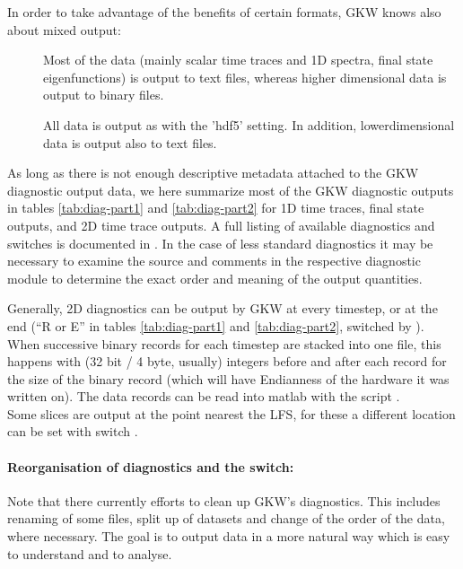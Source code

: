 In order to take advantage of the benefits of certain formats, GKW
knows also about mixed output:
\begin{description}
\item[] Most of the data (mainly scalar time
  traces and 1D spectra,  final state
  eigenfunctions) is output to text files, whereas higher dimensional
  data is output to binary files.
\item[] All data is output as with the
  'hdf5' setting. In addition, lowerdimensional data is output also to
  text files.
\end{description}

As long as there is not enough descriptive metadata attached to the
GKW diagnostic output data, we here summarize most of the GKW
diagnostic outputs in tables \ref{tab:diag-part1} and
\ref{tab:diag-part2} for 1D time traces, final state outputs, and 2D
time trace outputs.  A full listing of available diagnostics and
switches is documented in .  In the case of less
standard diagnostics it may be necessary to examine the source and
comments in the respective diagnostic module  to
determine the exact order and meaning of the output quantities.

Generally, 2D diagnostics can be output by GKW at every timestep, or
at the end (``R or E'' in tables \ref{tab:diag-part1} and
\ref{tab:diag-part2}, switched by ). \\
When successive binary records for each timestep are stacked into one
file, this happens with (32 bit / 4 byte, usually)
integers before and after each record for the size of the binary
record (which will have Endianness of the hardware it was written on).
The data records can be
read into matlab with the script .\\

Some slices are output at the point nearest the LFS, for
these a different location can be set with switch
. 

\paragraph*{Reorganisation of diagnostics and the  switch:}
Note that there currently efforts to clean up GKW's diagnostics. This
includes renaming of some files, split up of datasets and change of
the order of the data, where necessary. The goal is to output data in
a more natural way which is easy to understand and to analyse.

